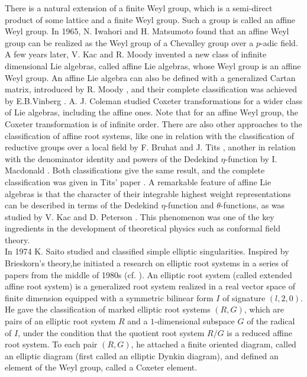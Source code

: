 \documentclass[11pt]{amsart}
\begin{document}
There is a natural extension of a finite Weyl group, which is a semi-direct product of 
some lattice and a finite Weyl group. Such a group is called an affine Weyl group. 
In 1965, N. Iwahori and H. Matsumoto \cite{IwahoriMatsumoto1965} found that an affine 
Weyl group can be realized as the Weyl group of a Chevalley group over a $p$-adic field. 
A few years later, V. Kac \cite{Kac1969} and R. Moody \cite{Moody1969} invented a new 
class of infinite dimensional Lie algebras, called affine Lie algebras, whose Weyl group is 
an affine Weyl group. An affine Lie algebra can also be defined with a generalized Cartan 
matrix, introduced by R. Moody \cite{Moody1968}, and their complete classification was 
achieved by E.B.Vinberg \cite{Vinberg1971}. A. J. Coleman \cite{Coleman1989} studied 
Coxeter transformations for a wider class of Lie algebras, including the affine ones. 
Note that for an affine Weyl group, the Coxeter transformation is of infinite order. 
There are also other approaches to the classification of affine root systems, like one in 
relation with the classification of reductive groups over a local field by F. Bruhat and J. Tits 
\cite{BruhatTits1972}, another in relation with the denominator identity and 
powers of the Dedekind $\eta$-function by I. Macdonald \cite{Macdonald1972}. 
Both classifications give the same result, and the complete classification was given in 
Tits' paper \cite{Tits1979}. A remarkable feature of affine Lie algebras is that the 
character of their integrable highest weight representations can be described in terms of 
the Dedekind $\eta$-function and $\theta$-functions, as was studied by V. Kac and D. 
Peterson \cite{KacPeterson1984}. 
This {phenomenon} was one of the key ingredients in the development 
of theoretical physics such as conformal field theory. \\
 
In 1974 K. Saito \cite{Saito1974} studied and classified simple elliptic singularities. 
Inspired by Brieskorn's theory,he 
initiated 
a research on elliptic root systems in a series of papers {from} the middle of 1980s (cf.  \cite{Saito1985}).
An elliptic root system (called extended affine root system) is a generalized root system realized in
a real vector space of finite dimension equipped with a symmetric bilinear form $I$ of signature
$(l,2,0)$. He gave the classification of marked elliptic root systems $(R,G)$, which are pairs of 
an elliptic root system $R$ and  a $1$-dimensional subspace $G$ of the radical of $I$, 
under the condition that the quotient root system $R/G$ is a 
reduced affine root system. To each pair $(R,G)$, he attached a finite oriented diagram, 
called an elliptic diagram (first called an elliptic Dynkin diagram), and defined an element of the Weyl group, called
a Coxeter element. \\
\end{document}
